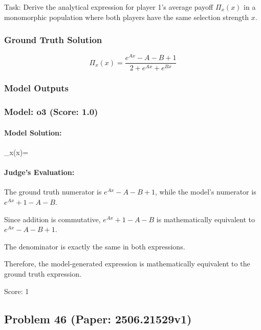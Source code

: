 \documentclass[10pt]{article}
\begin{document}
Task: Derive the analytical expression for player 1's average payoff $\Pi_x(x)$ in a monomorphic population where both players have the same selection strength $x$.

\subsubsection*{Ground Truth Solution}
\[ \boxed{\Pi_x(x) = \frac{e^{A x} - A - B + 1}{2 + e^{A x} + e^{B x}}} \]

\subsubsection*{Model Outputs}
\subsubsection*{Model: o3 (Score: 1.0)}
\paragraph*{Model Solution:}
\displaystyle
\Pi_x(x)=

\paragraph*{Judge's Evaluation:}

The ground truth numerator is \( e^{A x} - A - B + 1 \), while the model's numerator is \( e^{A x} + 1 - A - B \).

Since addition is commutative, \( e^{A x} + 1 - A - B \) is mathematically equivalent to \( e^{A x} - A - B + 1 \).

The denominator is exactly the same in both expressions.

Therefore, the model-generated expression is mathematically equivalent to the ground truth expression.

Score: 1

\newpage
\subsection*{Problem 46 (Paper: 2506.21529v1)}
\end{document}
